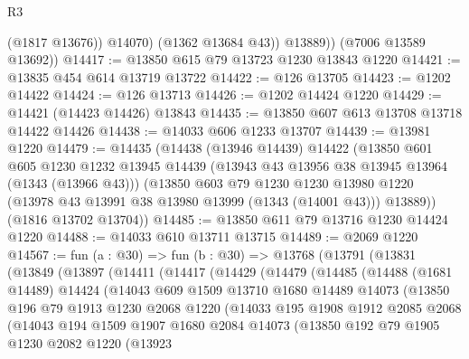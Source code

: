 \begin{lexlean}{R3}
\begin{coremodule}
                (@1817 @13676))
              @14070)
            (@1362 @13684 @43))
          @13889))
      (@7006 @13589 @13692))
@14417 := @13850 @615 @79 @13723 @1230 @13843 @1220
@14421 := @13835 @454 @614 @13719 @13722
@14422 := @126 @13705
@14423 := @1202 @14422
@14424 := @126 @13713
@14426 := @1202 @14424 @1220
@14429 := @14421 (@14423 @14426) @13843
@14435 := @13850 @607 @613 @13708 @13718 @14422 @14426
@14438 := @14033 @606 @1233 @13707
@14439 := @13981 @1220
@14479 := @14435
    (@14438
      (@13946 @14439)
      @14422
      (@13850
        @601
        @605
        @1230
        @1232
        @13945
        @14439
        (@13943 @43 @13956 @38 @13945 @13964 (@1343 (@13966 @43)))
        (@13850
          @603
          @79
          @1230
          @1230
          @13980
          @1220
          (@13978 @43 @13991 @38 @13980 @13999 (@1343 (@14001 @43)))
          @13889))
      (@1816 @13702 @13704))
@14485 := @13850 @611 @79 @13716 @1230 @14424 @1220
@14488 := @14033 @610 @13711 @13715
@14489 := @2069 @1220
@14567 := fun (a : @30) =>
  fun (b : @30) =>
  @13768
    (@13791
      (@13831
        (@13849
          (@13897
            (@14411
              (@14417
                (@14429
                  (@14479
                    (@14485
                      (@14488
                        (@1681 @14489)
                        @14424
                        (@14043
                          @609
                          @1509
                          @13710
                          @1680
                          @14489
                          @14073
                          (@13850
                            @196
                            @79
                            @1913
                            @1230
                            @2068
                            @1220
                            (@14033
                              @195
                              @1908
                              @1912
                              @2085
                              @2068
                              (@14043
                                @194
                                @1509
                                @1907
                                @1680
                                @2084
                                @14073
                                (@13850
                                  @192
                                  @79
                                  @1905
                                  @1230
                                  @2082
                                  @1220
                                  (@13923

\end{coremodule}
\end{lexlean}
